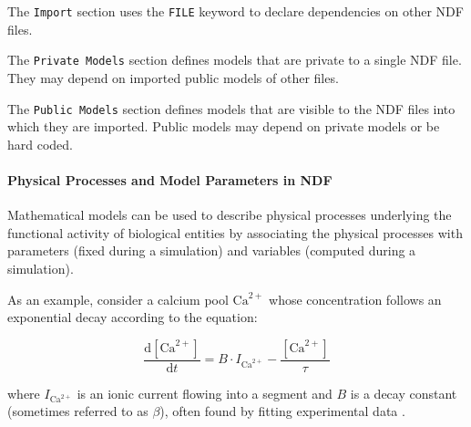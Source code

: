 \documentclass{article}
\begin{document}
The {\tt Import} section
 uses the {\tt FILE} keyword to declare
dependencies on other NDF files.


The {\tt Private Models} section
defines models that are private to a single NDF file.  They may depend on imported public models of
other files.

The {\tt Public Models} section defines models that are visible to the NDF files into
which they are imported.
  Public models may depend on private models or
be hard coded.

\paragraph{Physical Processes and Model Parameters in NDF}
Mathematical models can be used to describe physical processes
underlying the functional activity of biological entities by associating
the physical processes with parameters (fixed during a simulation) and
variables (computed during a simulation).

As an example, consider a calcium pool $\mathrm{Ca}^{2+}$ whose concentration
follows an exponential decay according to the equation:

\begin{equation}
  \label{eq:decay-concentration}
  \frac{\mathrm{d}[\mathrm{Ca}^{2+}]}{\mathrm{d}t} = B \cdot I_{\mathrm{Ca}^{2+}}
  - \frac{[\mathrm{Ca}^{2+}]}{\tau}
\end{equation}

where $I_{\mathrm{Ca}^{2+}}$ is an ionic current flowing into a segment
and $B$ is a decay constant (sometimes referred to as $\beta$), often
found by fitting experimental data \cite{bower98:_book_genes}.

\end{document}
